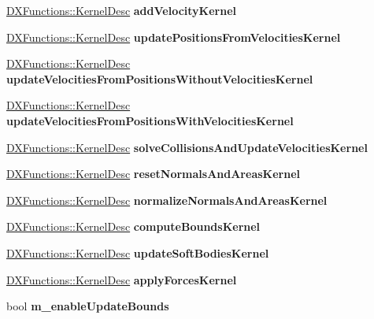 \begin{DoxyCompactItemize}
$$\hyperlink{classDXFunctions_1_1KernelDesc}{D\+X\+Functions\+::\+Kernel\+Desc} {\bfseries add\+Velocity\+Kernel}
\item 
\mbox{\label{classbtDX11SoftBodySolver_ab65ac00fb0dec0769383feaa866b6366}} 
\hyperlink{classDXFunctions_1_1KernelDesc}{D\+X\+Functions\+::\+Kernel\+Desc} {\bfseries update\+Positions\+From\+Velocities\+Kernel}
\item 
\mbox{\label{classbtDX11SoftBodySolver_a5f9ea6b8975d1e24cb5952de4c85f47a}} 
\hyperlink{classDXFunctions_1_1KernelDesc}{D\+X\+Functions\+::\+Kernel\+Desc} {\bfseries update\+Velocities\+From\+Positions\+Without\+Velocities\+Kernel}
\item 
\mbox{\label{classbtDX11SoftBodySolver_a5aaa80bfd210a5eb52a2a73b4751527b}} 
\hyperlink{classDXFunctions_1_1KernelDesc}{D\+X\+Functions\+::\+Kernel\+Desc} {\bfseries update\+Velocities\+From\+Positions\+With\+Velocities\+Kernel}
\item 
\mbox{\label{classbtDX11SoftBodySolver_a5a76ac12195e0b092dd775d213b23562}} 
\hyperlink{classDXFunctions_1_1KernelDesc}{D\+X\+Functions\+::\+Kernel\+Desc} {\bfseries solve\+Collisions\+And\+Update\+Velocities\+Kernel}
\item 
\mbox{\label{classbtDX11SoftBodySolver_ac390491491ef34549eb434d13e50c30d}} 
\hyperlink{classDXFunctions_1_1KernelDesc}{D\+X\+Functions\+::\+Kernel\+Desc} {\bfseries reset\+Normals\+And\+Areas\+Kernel}
\item 
\mbox{\label{classbtDX11SoftBodySolver_a4ffc8982ea4c4ab27222595fa991f2ac}} 
\hyperlink{classDXFunctions_1_1KernelDesc}{D\+X\+Functions\+::\+Kernel\+Desc} {\bfseries normalize\+Normals\+And\+Areas\+Kernel}
\item 
\mbox{\label{classbtDX11SoftBodySolver_a37912e870fe36d508cdb54be138aba56}} 
\hyperlink{classDXFunctions_1_1KernelDesc}{D\+X\+Functions\+::\+Kernel\+Desc} {\bfseries compute\+Bounds\+Kernel}
\item 
\mbox{\label{classbtDX11SoftBodySolver_a50df7dd3bac8371bf37e585e5853557e}} 
\hyperlink{classDXFunctions_1_1KernelDesc}{D\+X\+Functions\+::\+Kernel\+Desc} {\bfseries update\+Soft\+Bodies\+Kernel}
\item 
\mbox{\label{classbtDX11SoftBodySolver_add9011fbece2dd9007bf7b42e9db1528}} 
\hyperlink{classDXFunctions_1_1KernelDesc}{D\+X\+Functions\+::\+Kernel\+Desc} {\bfseries apply\+Forces\+Kernel}
\item 
\mbox{\label{classbtDX11SoftBodySolver_a1ecdf0329d9060c2b7ac7b7947a6edc6}} 
bool {\bfseries m\+\_\+enable\+Update\+Bounds}
\end{DoxyCompactItemize}
